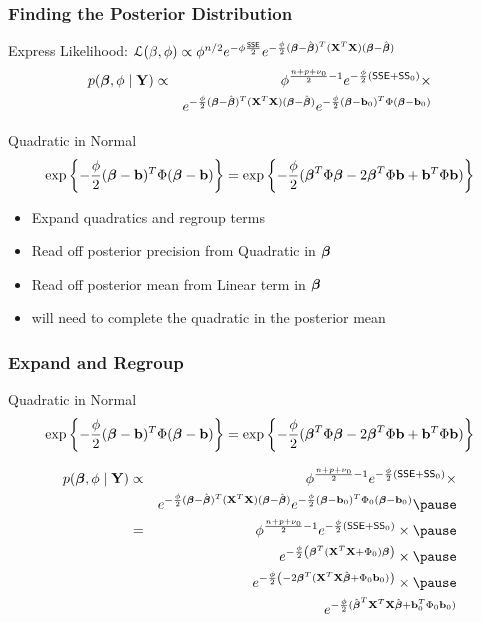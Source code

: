 \documentclass[]{beamer}
\begin{document}
\begin{frame}
\frametitle{Finding the Posterior Distribution}
Express Likelihood: ${\cal{L}}(\beta, \phi) \propto \phi^{n/2} e^{- \phi \frac{\textsf{SSE}}{2}}
e^{-\frac{\phi}{2} (\boldsymbol{\beta} - \hat{\boldsymbol{\beta}})^T(\mathbf{X}^T\mathbf{X}) (\boldsymbol{\beta} - \hat{\boldsymbol{\beta}})}$ \pause
\begin{eqnarray*}
 p(\boldsymbol{\beta}, \phi \mid \mathbf{Y}) &\propto&  \phi^{\frac {n + p + \nu_0}{ 2} - 1}
 e^{- \frac \phi 2 ( \textsf{SSE} + \textsf{SS}_0) } \times \\
 & & e^{-\frac{\phi}{2} (\boldsymbol{\beta} - \hat{\boldsymbol{\beta}})^T(\mathbf{X}^T\mathbf{X}) (\boldsymbol{\beta} - \hat{\boldsymbol{\beta}})}
 e^{- \frac{\phi}{2} (\boldsymbol{\beta} - \mathbf{b}_0)^T \Phi (\boldsymbol{\beta} - \mathbf{b}_0) }
\end{eqnarray*} \pause

Quadratic in Normal
$$\exp\left\{- \frac{\phi}{2} (\boldsymbol{\beta} - \mathbf{b})^T \Phi (\boldsymbol{\beta} - \mathbf{b}) \right\} = \exp\left\{-
  \frac{\phi}{2} (\boldsymbol{\beta}^T \Phi \boldsymbol{\beta} - 2 \boldsymbol{\beta}^T \Phi \mathbf{b} + \mathbf{b}^T\Phi \mathbf{b} )\right\}$$
\pause

  \begin{itemize}
  \item Expand quadratics and regroup terms \pause
  \item Read off posterior precision from Quadratic in $\boldsymbol{\beta}$ \pause
  \item Read off posterior mean from Linear term in $\boldsymbol{\beta}$ \pause
  \item will need to complete the quadratic in the posterior mean
  \end{itemize}
\end{frame}
\begin{frame}
  \frametitle{ Expand and Regroup}
  Quadratic in Normal
$$\exp\left\{- \frac{\phi}{2} (\boldsymbol{\beta} - \mathbf{b})^T \Phi (\boldsymbol{\beta} - \mathbf{b}) \right\} = \exp\left\{-
  \frac{\phi}{2} (\boldsymbol{\beta}^T \Phi \boldsymbol{\beta} - 2 \boldsymbol{\beta}^T \Phi \mathbf{b} + \mathbf{b}^T\Phi \mathbf{b} )\right\}$$
\pause

\begin{eqnarray*}
 p(\b, \phi \mid \Y) &\propto&  \phi^{\frac {n + p + \nu_0}{ 2} - 1}
 e^{- \frac \phi 2 ( \SSE + \SS_0) } \times  \\
 & & e^{-\frac{\phi}{2} (\b - \bhat)^T(\X^T\X) (\b - \bhat)}
 e^{- \frac{\phi}{2} (\b - \bv_0)^T \Phi_0 (\b - \bv_0) }  \pause  \\
 & = & \phi^{\frac {n + p + \nu_0}{ 2} - 1}
 e^{- \frac \phi 2 ( \SSE + \SS_0) } \times \pause \\
& &  e^{ -\frac{\phi}{2} \left(  \b^T (\X^T\X + \Phi_0) \b  \right) } \times \pause \\
& &  e^{  -\frac{\phi}{2} \left( -2 \b^T (\X^T\X \bhat  + \Phi_0 \bv_0)
   \right)} \times \pause \\
& &  e^{  -\frac{\phi}{2} (\bhat^T \X^T\X \bhat + \bv_0^T \Phi_0 \bv_0
  )}
\end{eqnarray*}




\end{frame}
\end{document}
